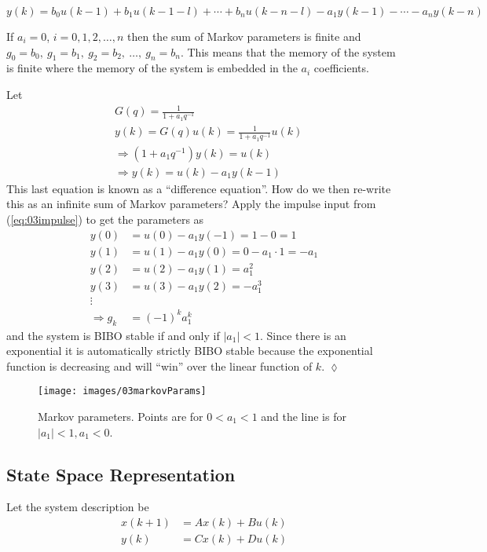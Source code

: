 \begin{equation*}
y(k) = b_0 u(k-1) + b_1 u(k-1-l) + \cdots + b_n u(k-n-l) - a_1 y(k-1) - \cdots - a_n y(k-n)
\end{equation*}

If $a_i=0$, $i=0,1,2,\ldots,n$ then the sum of Markov parameters is finite and $g_0=b_0,~g_1=b_1,~g_2=b_2,~\ldots,~g_n=b_n$.
This means that the memory of the system is finite where the memory of the system is embedded in the $a_i$ coefficients.

\begin{example}
Let
\begin{align*}
&G(q) = \frac{1}{1+a_1 q^{-1}} \\
&y(k) = G(q)u(k) = \frac{1}{1+a_1q^{-1}}u(k) \\
&\Rightarrow (1+a_1q^{-1})y(k) = u(k) \\
&\Rightarrow y(k) = u(k) - a_1y(k-1)
\end{align*}
This last equation is known as a ``difference equation''.
How do we then re-write this as an infinite sum of Markov parameters? Apply the impulse input from (\ref{eq:03impulse}) to get the parameters as
\begin{align*}
y(0) &= u(0) - a_1y(-1) = 1-0 = 1 \\
y(1) &= u(1) - a_1y(0) = 0 - a_1 \cdot 1 = -a_1 \\
y(2) &= u(2) - a_1y(1) = a_1^2 \\
y(3) &= u(3) - a_1y(2) = -a_1^3 \\
\vdots & \\
\Rightarrow g_k &= {(-1)}^k a_1^k
\end{align*}
and the system is BIBO stable if and only if $|a_1|<1$.
Since there is an exponential it is automatically strictly BIBO stable because the exponential function is decreasing and will ``win'' over the linear function of $k$.
$\lozenge$
\end{example}

\begin{figure}[ht!]
\centering
\texttt{[image: images/03markovParams]}
\caption{Markov parameters. Points are for $0<a_1<1$ and the line is for $|a_1|<1, a_1<0$.}%
\label{fig:03markovParams}
\end{figure}

\subsection{State Space Representation}
Let the system description be
\begin{align*}
x(k+1) &= Ax(k) + Bu(k) \\
y(k) &= Cx(k) + Du(k)
\end{align*}

